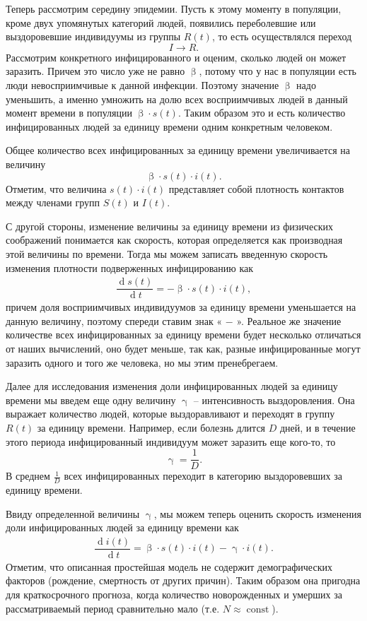 \documentclass[a4paper, 14pt]{extreport}
\numberwithin{equation}{section}
\renewcommand{\beta}{\upbeta}
\renewcommand{\gamma}{\upgamma}
\renewcommand{\d}{\operatorname{d}}
\begin{document}
	Теперь рассмотрим середину эпидемии. Пусть к этому моменту в популяции, кроме двух упомянутых категорий людей, появились переболевшие или выздоровевшие индивидуумы из группы $R(t)$, то есть осуществлялся переход $$I \to R.$$ Рассмотрим конкретного инфицированного и оценим, сколько людей он может заразить. Причем это число уже не равно $\beta$, потому что у нас в популяции есть люди
	невосприимчивые к данной инфекции. Поэтому значение $\beta$ надо уменьшить, а именно умножить на долю всех восприимчивых людей в данный момент времени в популяции $\beta \cdot s(t)$. Таким образом это и есть количество инфицированных людей за единицу времени одним конкретным человеком. 
	
	Общее количество всех инфицированных за единицу времени увеличивается на
	величину $$\beta \cdot s(t) \cdot i(t).$$
	Отметим, что величина $s(t)\cdot i(t)$
	представляет собой плотность контактов между членами групп
	$S(t)$ и $I(t)$.
	
	С другой стороны, изменение величины за единицу времени из физических соображений понимается как скорость, которая определяется как производная этой величины по времени. Тогда мы можем записать введенную  скорость изменения плотности подверженных инфицированию как 
	\begin{eqnarray}
		\dfrac {\d s(t)}{\d t} = -\beta \cdot s(t) \cdot i(t),
	\end{eqnarray}
	причем доля восприимчивых индивидуумов за единицу времени
	уменьшается на данную величину, поэтому спереди ставим знак « $-$ ».
	Реальное же значение количестве всех инфицированных за единицу времени будет несколько отличаться от наших вычислений, оно будет меньше, так как, разные инфицированные могут заразить одного и того же человека, но мы этим пренебрегаем. 
	
	Далее для исследования изменения доли инфицированных людей за единицу времени мы введем еще одну величину $\gamma$ -- интенсивность выздоровления. Она выражает количество людей, которые
	выздоравливают и переходят в группу $R(t)$ за единицу времени. Например, если болезнь длится $D$ дней, и в течение этого
	периода инфицированный индивидуум может заразить еще кого-то, то $$\gamma = \dfrac 1D.$$
	В среднем $\frac 1D$ всех инфицированных переходит в категорию выздоровевших за единицу времени.
	
	Ввиду определенной величины $\gamma$, мы можем теперь оценить скорость изменения доли инфицированных людей за единицу времени как \begin{eqnarray}
		\dfrac{\d i(t)}{\d t} = \beta \cdot s(t)\cdot i(t) - \gamma\cdot i(t).
	\end{eqnarray}
	Отметим, что описанная простейшая модель не содержит демографических
	факторов (рождение, смертность от других причин). Таким образом она пригодна для
	краткосрочного прогноза, когда количество новорожденных и умерших за
	рассматриваемый период сравнительно мало (т.е. $N\approx \operatorname{const}$).
	
\end{document}
